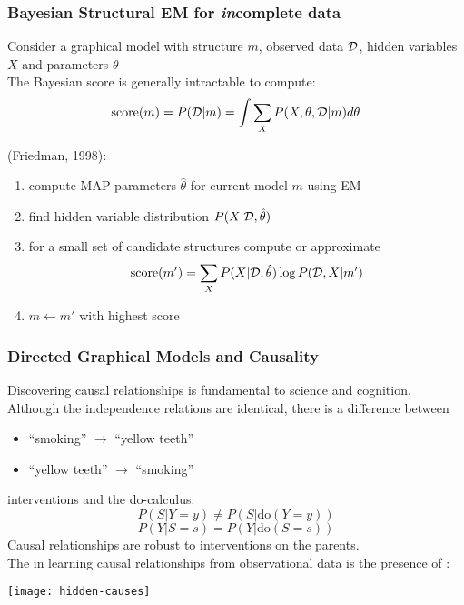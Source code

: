 \begin{frame}
\frametitle{Bayesian Structural EM for {\em in}complete data}

Consider a graphical model with structure $m$, observed data $\mathcal{D}$,
hidden variables $X$ and parameters $\theta$\\[2ex]

The Bayesian score is generally intractable to compute:
\[
\mbox{score}(m) = P(\mathcal{D}|m) = \int \sum_X P(X,\theta,\mathcal{D}|m) d \theta
\]

 (Friedman, 1998):
\begin{enumerate}
\item compute MAP parameters $\hat{\theta}$ for current model $m$ using EM
\item find hidden variable distribution $P(X|\mathcal{D},\hat{\theta})$
\item for a small set of candidate structures compute or
approximate \[
\mbox{score}(m') = \sum_X P(X|\mathcal{D},\hat{\theta}) \log
P(\mathcal{D},X|m')
\]
\item $ m \leftarrow m'$ with highest score
\end{enumerate}

\end{frame}
\begin{frame}
\frametitle{Directed Graphical Models and Causality}

Discovering causal relationships is fundamental to science and cognition.\\[2ex]

Although the independence relations are identical,
there is a  difference between \\[-1ex]
\begin{itemize}
\item ``smoking'' $\rightarrow$ ``yellow teeth''
\item ``yellow teeth''  $\rightarrow$ ``smoking''
\end{itemize}

 interventions and the do-calculus:
\[
P(S|Y=y) \neq P(S|\mbox{do}(Y=y))
\]
\[
P(Y|S=s) = P(Y|\mbox{do}(S=s))
\] 
Causal relationships are robust to interventions on the parents.\\[1ex]

The  in learning causal relationships from
observational data is the presence of :

\centerline{\texttt{[image: hidden-causes]}}

\end{frame}
